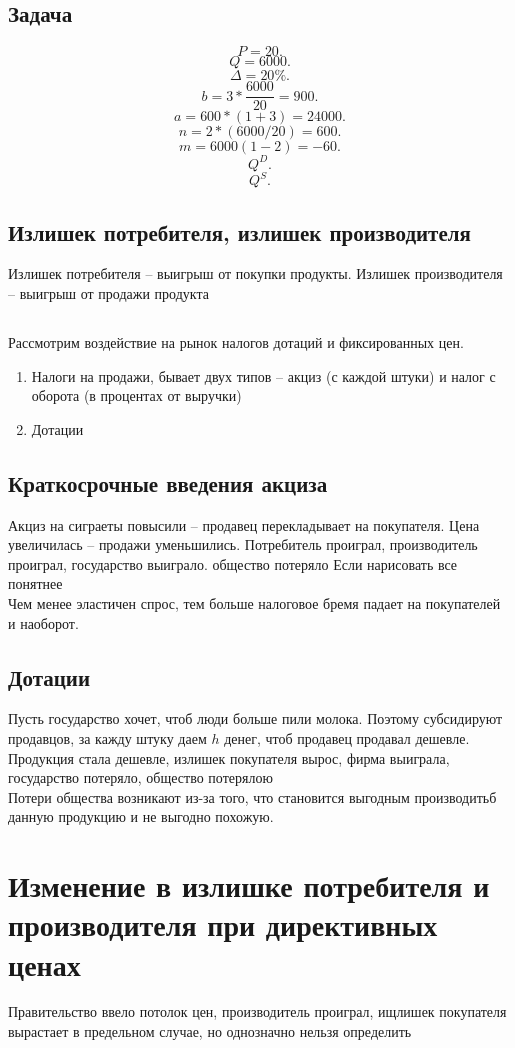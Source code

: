 \documentclass[14pt]{extarticle}
\begin{document}
\subsection{Задача}
\[
P = 20
.\] 
\[
Q = 6000
.\] 
\[
\varDelta = 20 \%
.\] 
\[
b = 3 * \frac{6000}{20} = 900
.\] 
\[
a = 600 * ( 1 + 3) = 24000
.\] 
\[
n = 2 * (6000 / 20) = 600
.\] 
\[
m = 6000 (1 -2) = -60
.\] 
\[
Q^{D}
.\] 
\[
Q^{S}
.\] 
\subsection{Излишек потребителя, излишек производителя}
Излишек потребителя -- выигрыш от покупки продукты. Излишек производителя -- выигрыш от продажи продукта
\subsection{}
Рассмотрим воздействие на рынок налогов дотаций и фиксированных цен.
\begin{enumerate}
    \item Налоги на продажи, бывает двух типов -- акциз (с каждой штуки) и налог с оборота (в процентах от выручки)
    \item Дотации
\end{enumerate}
\subsection{Краткосрочные введения акциза}
Акциз на сиграеты повысили -- продавец перекладывает на покупателя. Цена увеличилась -- продажи уменьшились.
Потребитель проиграл, производитель проиграл, государство выиграло.
общество потеряло
Если нарисовать все понятнее\\
Чем менее эластичен спрос, тем больше налоговое бремя падает на покупателей и наоборот.
\subsection{Дотации}
Пусть государство хочет, чтоб люди больше пили молока. Поэтому субсидируют продавцов, 
за кажду штуку даем $h$ денег, чтоб продавец продавал дешевле. Продукция стала дешевле, излишек покупателя вырос, фирма выиграла, государство потеряло, общество потерялою
\\
Потери общества возникают из-за того, что становится выгодным производитьб данную продукцию и не выгодно похожую.
\section{Изменение в излишке потребителя и производителя при директивных ценах}
Правительство ввело потолок цен, производитель проиграл, ищлишек покупателя вырастает в предельном случае, но однозначно нельзя определить
\end{document}
